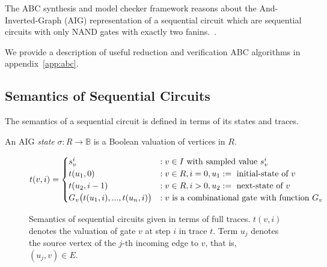 The ABC synthesis and model checker framework reasons about 
the And-Inverted-Graph (AIG) representation of a sequential 
circuit which are sequential circuits with only NAND gates 
with exactly two fanins.~\cite{brayton2010abc}. 

We provide a description of useful reduction
and verification ABC algorithms in appendix~\ref{app:abc}. 


\subsection{Semantics of Sequential Circuits}
\label{s:back:crct_semantics}
%
The semantics of a sequential circuit is defined in terms of its states and traces.
%
\begin{definition}
An AIG \emph{state} $\sigma: R \rightarrow \mathbb{B}$ is a Boolean valuation of vertices in $R$. 
\end{definition}
%


%
\begin{figure*}
\[
t(v,i)=
   \begin{cases}
      s^i_{v}            &:v \in I \ \text{with sampled value $s_{v}^i$}\\
      t(u_1, 0)       &:v \in R,i=0,u_1:=\ \text{initial-state of $v$}\\
      t(u_2, i-1)        &:v \in R,i>0,u_2:=\ \text{next-state of $v$}\\
      G_v\big(t(u_{1},i),...,t(u_{n},i)\big) &: v \ \text{is a combinational gate with function $G_v$}
   \end{cases} \newline
\]
\caption{Semantics of sequential circuits given in terms of 
  full traces. $t(v,i)$ denotes the valuation of gate $v$ at step $i$ in trace $t$.
Term $u_{j}$ denotes the source vertex of the $j$-th incoming edge to $v$, that is, %
$(u_{j},v)\in E$.
  }
\label{fig:gate-value}
\end{figure*}
%

